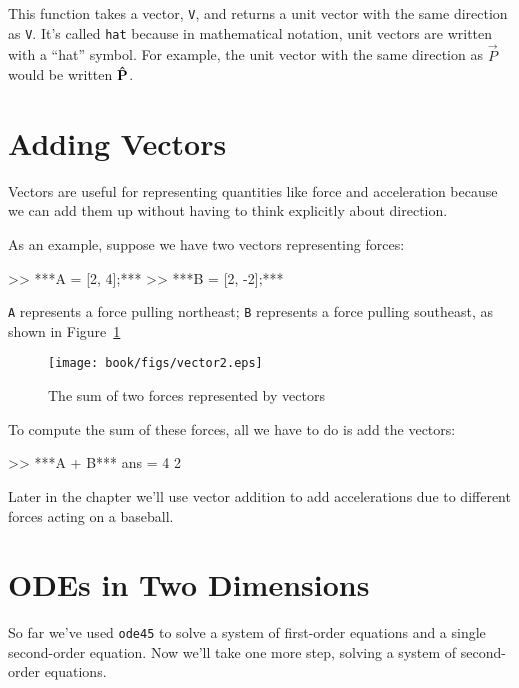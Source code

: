 This function takes a vector, \lstinline{V}, and returns a unit vector with the same direction as \lstinline{V}.  It's called \lstinline{hat} because in mathematical notation, unit vectors are written with a ``hat'' symbol.  
For example, the unit vector with the same direction as $\vec{P}$ would be written $\uvec{P}$. 


\section{Adding Vectors}

Vectors are useful for representing quantities like force and acceleration because we can add them up without having to think explicitly about direction.


As an example, suppose we have two vectors representing forces:

\begin{code}
>> ***A = [2, 4];***
>> ***B = [2, -2];***
\end{code}

\lstinline{A} represents a force pulling northeast; \lstinline{B} represents a force pulling southeast, as shown in Figure~\ref{fig:vector2}

\begin{figure}[ht]
\centerline{\texttt{[image: book/figs/vector2.eps]}}
\caption{The sum of two forces represented by vectors}
\label{fig:vector2}
\end{figure}

To compute the sum of these forces, all we have to do is add the vectors:

\begin{code}
>> ***A + B***
ans = 4     2
\end{code}

Later in the chapter we'll use vector addition to add accelerations due to different forces acting on a baseball.


\section{ODEs in Two Dimensions}
\label{projectile}

So far we've used \lstinline{ode45} to solve a system of first-order equations and a single second-order equation.  Now we'll take one more step, solving a system of second-order equations.

